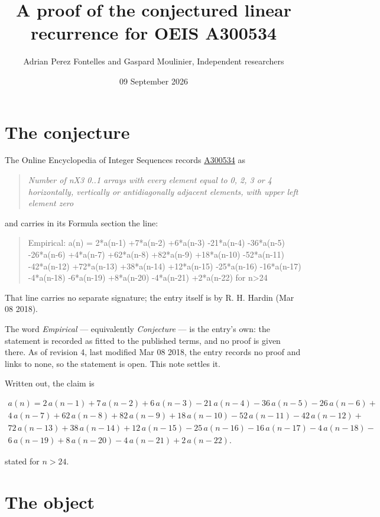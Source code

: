 \documentclass[11pt]{article}
\title{A proof of the conjectured linear recurrence for OEIS A300534}
\author{Adrian Perez Fontelles and Gaspard Moulinier, Independent researchers}
\date{09 September 2026}
\theoremstyle{definition}
\begin{document}
\maketitle
\section{The conjecture}

The Online Encyclopedia of Integer Sequences records \href{https://oeis.org/A300534}{A300534} as

\begin{quote}\itshape Number of nX3 0..1 arrays with every element equal to 0, 2, 3 or 4 horizontally, vertically or antidiagonally adjacent elements, with upper left element zero\end{quote}

and carries in its Formula section the line:

\begin{quote}\ttfamily Empirical: a(n) = 2*a(n-1) +7*a(n-2) +6*a(n-3) -21*a(n-4) -36*a(n-5) -26*a(n-6) +4*a(n-7) +62*a(n-8) +82*a(n-9) +18*a(n-10) -52*a(n-11) -42*a(n-12) +72*a(n-13) +38*a(n-14) +12*a(n-15) -25*a(n-16) -16*a(n-17) -4*a(n-18) -6*a(n-19) +8*a(n-20) -4*a(n-21) +2*a(n-22) for n>24\end{quote}

That line carries no separate signature; the entry itself is by R. H. Hardin (Mar 08 2018).

The word {\itshape Empirical} --- equivalently {\itshape Conjecture} --- is the entry's own: the statement is recorded as fitted to the published terms, and no proof is given there. As of revision 4, last modified Mar 08 2018, the entry records no proof and links to none, so the statement is open. This note settles it.

Written out, the claim is

\begin{multline*} a(n) = 2\,a(n-1) + 7\,a(n-2) + 6\,a(n-3) - 21\,a(n-4) - 36\,a(n-5) - 26\,a(n-6) + \\ 4\,a(n-7) + 62\,a(n-8) + 82\,a(n-9) + 18\,a(n-10) - 52\,a(n-11) - 42\,a(n-12) + \\ 72\,a(n-13) + 38\,a(n-14) + 12\,a(n-15) - 25\,a(n-16) - 16\,a(n-17) - 4\,a(n-18) - \\ 6\,a(n-19) + 8\,a(n-20) - 4\,a(n-21) + 2\,a(n-22). \end{multline*}

stated for $n > 24$.

\section{The object}
\end{document}
